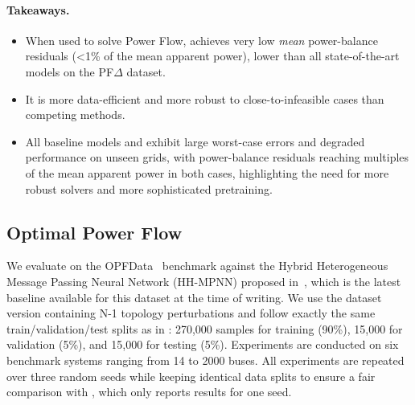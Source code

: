 \begin{boxH}
\paragraph{Takeaways.}
\begin{itemize}
\item When used to solve Power Flow, \genco achieves very low \emph{mean} power-balance residuals (\textless 1\% of the mean apparent power), lower than all state-of-the-art models on the PF$\Delta$ dataset.
\item It is more data-efficient and more robust to close-to-infeasible cases than competing methods.
\item All baseline models and \genco exhibit large worst-case errors and degraded performance on unseen grids, with power-balance residuals reaching multiples of the mean apparent power in both cases, highlighting the need for more robust solvers and more sophisticated pretraining.\end{itemize}
\end{boxH}

\subsection{Optimal Power Flow}
\label{subsec:opf}




We evaluate \genco on the OPFData~\cite{lovett2024opfdatalargescaledatasetsac} benchmark against the Hybrid Heterogeneous Message Passing Neural Network (HH-MPNN) proposed in~\cite{arowolo2025}, which is the latest baseline available for this dataset at the time of writing. We use the dataset version containing N-1 topology perturbations and follow exactly the same train/validation/test splits as in \cite{arowolo2025}: 270,000 samples for training (90\%), 15,000 for validation (5\%), and 15,000 for testing (5\%). Experiments are conducted on six benchmark systems ranging from 14 to 2000 buses. All \genco experiments are repeated over three random seeds while keeping identical data splits to ensure a fair comparison with \cite{arowolo2025}, which only reports results for one seed.
\\\\

